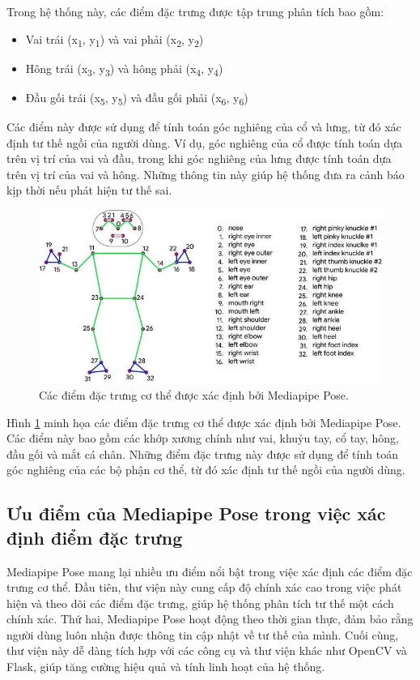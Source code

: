 \documentclass[conference]{IEEEtran}
\begin{document}
Trong hệ thống này, các điểm đặc trưng được tập trung phân tích bao gồm:
\begin{itemize}
    \item Vai trái (x\textsubscript{1}, y\textsubscript{1}) và vai phải (x\textsubscript{2}, y\textsubscript{2})
    \item Hông trái (x\textsubscript{3}, y\textsubscript{3}) và hông phải (x\textsubscript{4}, y\textsubscript{4})
    \item Đầu gối trái (x\textsubscript{5}, y\textsubscript{5}) và đầu gối phải (x\textsubscript{6}, y\textsubscript{6})
\end{itemize}

Các điểm này được sử dụng để tính toán góc nghiêng của cổ và lưng, từ đó xác định tư thế ngồi của người dùng. Ví dụ, góc nghiêng của cổ được tính toán dựa trên vị trí của vai và đầu, trong khi góc nghiêng của lưng được tính toán dựa trên vị trí của vai và hông. Những thông tin này giúp hệ thống đưa ra cảnh báo kịp thời nếu phát hiện tư thế sai.

\begin{figure}[H]
    \centering
    \includegraphics[width=0.8\linewidth]{images/body_keypoints.png}
    \caption{Các điểm đặc trưng cơ thể được xác định bởi Mediapipe Pose.}
    \label{fig:body_keypoints}
\end{figure}

Hình \ref{fig:body_keypoints} minh họa các điểm đặc trưng cơ thể được xác định bởi Mediapipe Pose. Các điểm này bao gồm các khớp xương chính như vai, khuỷu tay, cổ tay, hông, đầu gối và mắt cá chân. Những điểm đặc trưng này được sử dụng để tính toán góc nghiêng của các bộ phận cơ thể, từ đó xác định tư thế ngồi của người dùng.

\subsection{Ưu điểm của Mediapipe Pose trong việc xác định điểm đặc trưng}
Mediapipe Pose mang lại nhiều ưu điểm nổi bật trong việc xác định các điểm đặc trưng cơ thể. Đầu tiên, thư viện này cung cấp độ chính xác cao trong việc phát hiện và theo dõi các điểm đặc trưng, giúp hệ thống phân tích tư thế một cách chính xác. Thứ hai, Mediapipe Pose hoạt động theo thời gian thực, đảm bảo rằng người dùng luôn nhận được thông tin cập nhật về tư thế của mình. Cuối cùng, thư viện này dễ dàng tích hợp với các công cụ và thư viện khác như OpenCV và Flask, giúp tăng cường hiệu quả và tính linh hoạt của hệ thống.
\end{document}
